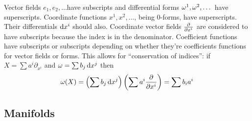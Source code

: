 Vector fields \(e_1, e_2, \dots\)have subscripts and differential forms \(\omega^1, \omega^2, \dots\) have superscripts.
%
Coordinate functions \(x^1, x^2, \dots\), being 0-forms, have superscripts.
%
Their differentials \(\dif x^i\) should also. 
%
Coordinate vector fields \(\pdv{}{x^i}\) are considered to have subscripts because the index is in the denominator.
%
Coefficient functions have subscripts or subscripts depending on whether they're coefficients functions for vector fields or forms.
%
This allows for ``conservation of indices'': if \(X = \sum a^i \partial_{x^i}\) and \(\w = \sum b_j \dif x^j\) then 
\[
    \w(X) = \left( \sum b_j \dif x^j \right) \left( \sum a^i \pdv{}{x^i} \right) = \sum b_i a^i
\]

\subsection{Manifolds}
